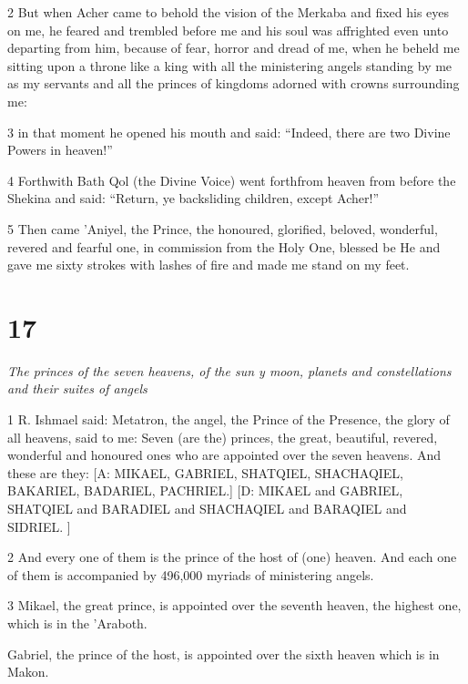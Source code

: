 \par 2 But when Acher came to behold the vision of the Merkaba and fixed his eyes on me, he feared and trembled before me and his soul was affrighted even unto departing from him, because of fear, horror and dread of me, when he beheld me sitting upon a throne like a king with all the ministering angels standing by me as my servants and all the princes of kingdoms adorned with crowns surrounding me:

\par 3 in that moment he opened his mouth and said: “Indeed, there are two Divine Powers in heaven!”

\par 4 Forthwith Bath Qol (the Divine Voice) went forthfrom heaven from before the Shekina and said: “Return, ye backsliding children, except Acher!”

\par 5 Then came 'Aniyel, the Prince, the honoured, glorified, beloved, wonderful, revered and fearful one, in commission from the Holy One, blessed be He and gave me sixty strokes with lashes of fire and made me stand on my feet. 

\chapter{17}

\par \textit{The princes of the seven heavens, of the sun y moon, planets and constellations and their suites of angels}

\par 1 R. Ishmael said: Metatron, the angel, the Prince of the Presence, the glory of all heavens, said to me: Seven (are the) princes, the great, beautiful, revered, wonderful and honoured ones who are appointed over the seven heavens. And these are they: [A: MIKAEL, GABRIEL, SHATQIEL, SHACHAQIEL, BAKARIEL, BADARIEL, PACHRIEL.] [D: MIKAEL and GABRIEL, SHATQIEL and BARADIEL and SHACHAQIEL and BARAQIEL and SIDRIEL. ]

\par 2 And every one of them is the prince of the host of (one) heaven. And each one of them is accompanied by 496,000 myriads of ministering angels. 

\par 3 Mikael, the great prince, is appointed over the seventh heaven, the highest one, which is in the 'Araboth. 

\par Gabriel, the prince of the host, is appointed over the sixth heaven which is in Makon.

